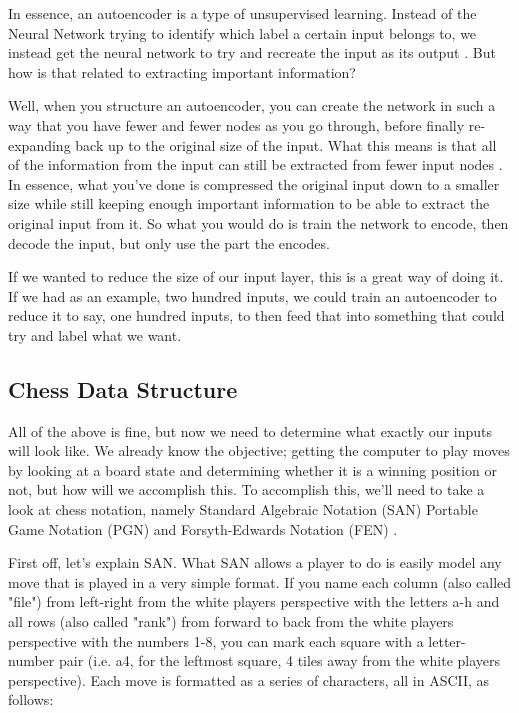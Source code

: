 \documentclass[12pt]{article}
\begin{document}
    In essence, an autoencoder is a type of unsupervised learning. Instead of the Neural Network trying to identify which label a certain input belongs to, we instead get the neural network to try and recreate the input as its output \cite{nn_autoencoders}. But how is that related to extracting important information?

    Well, when you structure an autoencoder, you can create the network in such a way that you have fewer and fewer nodes as you go through, before finally re-expanding back up to the original size of the input. What this means is that all of the information from the input can still be extracted from fewer input nodes \cite{deepchess}. In essence, what you've done is compressed the original input down to a smaller size while still keeping enough important information to be able to extract the original input from it. So what you would do is train the network to encode, then decode the input, but only use the part the encodes.

    If we wanted to reduce the size of our input layer, this is a great way of doing it. If we had as an example, two hundred inputs, we could train an autoencoder to reduce it to say, one hundred inputs, to then feed that into something that could try and label what we want. 

    \subsection{Chess Data Structure}

    All of the above is fine, but now we need to determine what exactly our inputs will look like. We already know the objective; getting the computer to play moves by looking at a board state and determining whether it is a winning position or not, but how will we accomplish this. To accomplish this, we'll need to take a look at chess notation, namely Standard Algebraic Notation (SAN) Portable Game Notation (PGN) and Forsyth-Edwards Notation (FEN) \cite{pgnrules}.

    First off, let's explain SAN. What SAN allows a player to do is easily model any move that is played in a very simple format. If you name each column (also called "file") from left-right from the white players perspective with the letters a-h and all rows (also called "rank") from forward to back from the white players perspective with the numbers 1-8, you can mark each square with a letter-number pair (i.e. a4, for the leftmost square, 4 tiles away from the white players perspective). Each move is formatted as a series of characters, all in ASCII, as follows:
\end{document}
